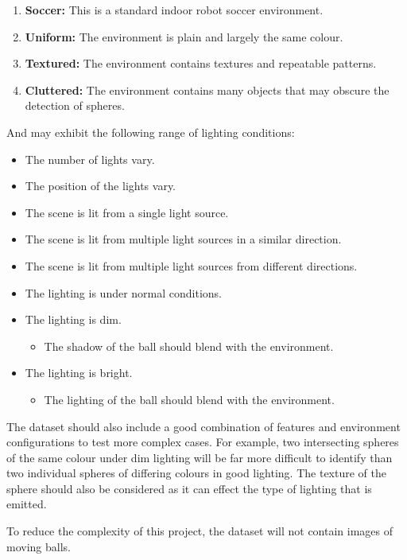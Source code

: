 \documentclass[11pt]{scrartcl}
\begin{document}
{{        	\begin{enumerate}
        		\item \textbf{Soccer:} This is a standard indoor robot soccer 
        		environment.
        		\item \textbf{Uniform:} The environment is plain and largely the same
        		colour.
        		\item \textbf{Textured:} The environment contains textures and
        		repeatable patterns.
        		\item \textbf{Cluttered:} The environment contains many objects that
        		may obscure the detection of spheres.
        	\end{enumerate}
        	
        	And may exhibit the following range of lighting conditions:

        	\begin{itemize}
        		\item The number of lights vary.
        		\item The position of the lights vary.
        		\item The scene is lit from a single light source.
        		\item The scene is lit from multiple light sources in a similar direction.
        		\item The scene is lit from multiple light sources from different directions.
        		\item The lighting is under normal conditions.
        		\item The lighting is dim.
        		\begin{itemize}
        			\item The shadow of the ball should blend with the environment.
        		\end{itemize}
        		\item The lighting is bright.
        		\begin{itemize}
        			\item The lighting of the ball should blend with the environment.
        		\end{itemize}
        	\end{itemize}

        	The dataset should also include a good combination of features and
        	environment configurations to test more complex cases. For example, two
        	intersecting spheres of the same colour under dim lighting will be far 
        	more difficult to identify than two individual spheres of differing
        	colours in good lighting. The texture of the sphere should also be
        	considered as it can effect the type of lighting that is emitted.


            To reduce the complexity of this project, the dataset will not contain
            images of moving balls.

        }

	}
\end{document}
